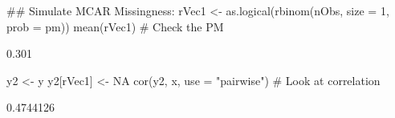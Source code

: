 \begin{Schunk}
\begin{Sinput}
 ## Simulate MCAR Missingness:
 rVec1 <- as.logical(rbinom(nObs, size = 1, prob = pm))
 mean(rVec1) # Check the PM
\end{Sinput}
\begin{Soutput}
[1] 0.301
\end{Soutput}
\begin{Sinput}
 y2 <- y
 y2[rVec1] <- NA
 cor(y2, x, use = "pairwise") # Look at correlation
\end{Sinput}
\begin{Soutput}
[1] 0.4744126
\end{Soutput}
\begin{Sinput}
 
\end{Sinput}
\end{Schunk}
